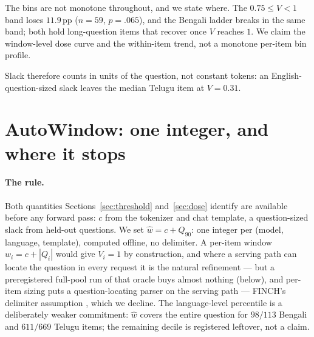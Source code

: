 \documentclass{article}
\begin{document}
The bins are not monotone throughout, and we state where. The
$0.75\le V<1$ band loses $11.9$\,pp ($n{=}59$, $p{=}.065$), and the
Bengali ladder breaks in the same band; both hold long-question items
that recover once $V$ reaches $1$. We claim the
window-level dose curve and the within-item trend, not a monotone
per-item bin profile.

Slack therefore counts in units of the question, not constant
tokens: an English-question-sized slack leaves the median Telugu item
at $V{=}0.31$.

\section{AutoWindow: one integer, and where it stops}
\label{sec:autowindow}

\paragraph{The rule.}
Both quantities Sections~\ref{sec:threshold} and~\ref{sec:dose}
identify are available before any forward pass: $c$ from the
tokenizer and chat template, a question-sized slack from held-out
questions. We set $\hat w = c + Q_{90}$: one integer per (model,
language, template), computed offline, no delimiter. A per-item window $w_i{=}c+|Q_i|$ would give $V_i{=}1$ by
construction, and where a serving path can locate the question in
every request it is the natural refinement --- but a preregistered
full-pool run of that oracle buys almost nothing (below), and
per-item sizing puts a question-locating parser on the serving path
--- FINCH's delimiter assumption \citep{corallo2024finch}, which we
decline. The language-level percentile is a deliberately weaker commitment:
$\hat w$ covers the entire question for $98/113$ Bengali and $611/669$
Telugu items; the remaining decile is registered leftover, not a
claim.
\end{document}
